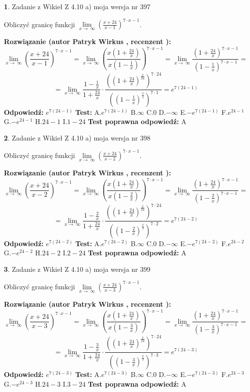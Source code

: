 \documentclass[12pt, a4paper]{article}
\theoremstyle{definition} %
\newtheorem{zad}{}
\newcommand{\zadStart}[1]{\begin{zad}#1\newline}
\newcommand{\zadStop}{\end{zad}}
\newcommand{\rozwStart}[2]{\noindent \textbf{Rozwiązanie (autor #1 , recenzent #2): }\newline}
\newcommand{\rozwStop}{\newline}
\newcommand{\odpStart}{\noindent \textbf{Odpowiedź:}\newline}
\newcommand{\odpStop}{\newline}
\newcommand{\testStart}{\noindent \textbf{Test:}\newline}
\newcommand{\testStop}{\newline}
\newcommand{\kluczStart}{\noindent \textbf{Test poprawna odpowiedź:}\newline}
\newcommand{\kluczStop}{\newline}
\begin{document}
\zadStart{Zadanie z Wikieł Z 4.10 a) moja wersja nr 397}


Obliczyć granicę funkcji  $\lim\limits_{x\to\ \infty}(\frac{x+24}{x-1})^{7\cdot x-1}$.
\zadStop
\rozwStart{Patryk Wirkus}{}
$$\lim\limits_{x\to\ \infty}(\frac{x+24}{x-1})^{7\cdot x-1} = \lim\limits_{x\to\ \infty}(\frac{x(1+\frac{24}{x})}{x(1-\frac{1}{x})})^{7\cdot x-1}=\lim\limits_{x\to\ \infty}\frac{(1+\frac{24}{x})^{7\cdot x-1}}{(1-\frac{1}{x})^{7\cdot x-1}}=$$
$$=\lim\limits_{x\to\ \infty}\frac{1-\frac{1}{x}}{1+\frac{24}{x}}\cdot\frac{((1+\frac{24}{x})^{\frac{x}{24}})^{7\cdot24}}{((1-\frac{1}{x})^{\frac{x}{1}})^{7\cdot1}}=e^{7(24-1)}$$
\rozwStop
\odpStart
$e^{7(24-1)}$
\odpStop
\testStart
A.$e^{7(24-1)}$ B.$\infty$ C.$0$ D.$-\infty$ E.$-e^{7(24-1)}$
F.$e^{24-1}$ G.$-e^{24-1}$
H.$24-1$
I.$1-24$
\testStop
\kluczStart
A
\kluczStop



\zadStart{Zadanie z Wikieł Z 4.10 a) moja wersja nr 398}


Obliczyć granicę funkcji  $\lim\limits_{x\to\ \infty}(\frac{x+24}{x-2})^{7\cdot x-1}$.
\zadStop
\rozwStart{Patryk Wirkus}{}
$$\lim\limits_{x\to\ \infty}(\frac{x+24}{x-2})^{7\cdot x-1} = \lim\limits_{x\to\ \infty}(\frac{x(1+\frac{24}{x})}{x(1-\frac{2}{x})})^{7\cdot x-1}=\lim\limits_{x\to\ \infty}\frac{(1+\frac{24}{x})^{7\cdot x-1}}{(1-\frac{2}{x})^{7\cdot x-1}}=$$
$$=\lim\limits_{x\to\ \infty}\frac{1-\frac{2}{x}}{1+\frac{24}{x}}\cdot\frac{((1+\frac{24}{x})^{\frac{x}{24}})^{7\cdot24}}{((1-\frac{2}{x})^{\frac{x}{2}})^{7\cdot2}}=e^{7(24-2)}$$
\rozwStop
\odpStart
$e^{7(24-2)}$
\odpStop
\testStart
A.$e^{7(24-2)}$ B.$\infty$ C.$0$ D.$-\infty$ E.$-e^{7(24-2)}$
F.$e^{24-2}$ G.$-e^{24-2}$
H.$24-2$
I.$2-24$
\testStop
\kluczStart
A
\kluczStop



\zadStart{Zadanie z Wikieł Z 4.10 a) moja wersja nr 399}


Obliczyć granicę funkcji  $\lim\limits_{x\to\ \infty}(\frac{x+24}{x-3})^{7\cdot x-1}$.
\zadStop
\rozwStart{Patryk Wirkus}{}
$$\lim\limits_{x\to\ \infty}(\frac{x+24}{x-3})^{7\cdot x-1} = \lim\limits_{x\to\ \infty}(\frac{x(1+\frac{24}{x})}{x(1-\frac{3}{x})})^{7\cdot x-1}=\lim\limits_{x\to\ \infty}\frac{(1+\frac{24}{x})^{7\cdot x-1}}{(1-\frac{3}{x})^{7\cdot x-1}}=$$
$$=\lim\limits_{x\to\ \infty}\frac{1-\frac{3}{x}}{1+\frac{24}{x}}\cdot\frac{((1+\frac{24}{x})^{\frac{x}{24}})^{7\cdot24}}{((1-\frac{3}{x})^{\frac{x}{3}})^{7\cdot3}}=e^{7(24-3)}$$
\rozwStop
\odpStart
$e^{7(24-3)}$
\odpStop
\testStart
A.$e^{7(24-3)}$ B.$\infty$ C.$0$ D.$-\infty$ E.$-e^{7(24-3)}$
F.$e^{24-3}$ G.$-e^{24-3}$
H.$24-3$
I.$3-24$
\testStop
\kluczStart
A
\kluczStop
\end{document}
